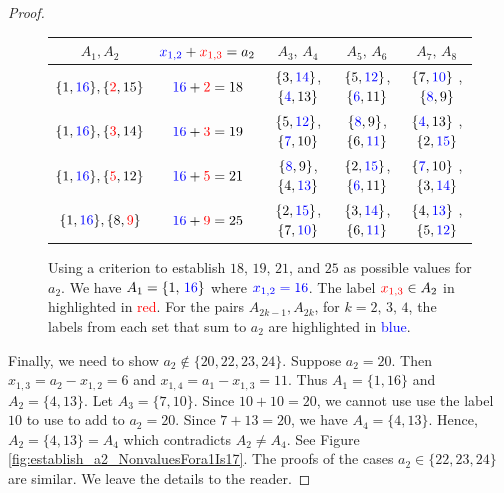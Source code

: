 \documentclass[10pt,a4paper]{amsart}
\begin{document}
\begin{proof}
\begin{figure}[ht]
    \centering
    {\small
\renewcommand{\arraystretch}{1.5}
\begin{tabular}{|c|c|c|c|c|} \hline
$A_1, A_2$ & $\textcolor{blue}{x_{1,2}} +\textcolor{red}{x_{1,3}}=a_2$ & $A_3,\, A_4$ &  $A_5,\, A_6$ 
&  $A_7,\, A_8$\\  \hline
$\{1, \textcolor{blue}{16}\}, \{\textcolor{red}{2},15\}$ & $\textcolor{blue}{16}+\textcolor{red}{2}=18$ 
& $\{ 3,\textcolor{blue}{14}\}$, $\{ \textcolor{blue}{4},13\}$  
&  $\{ 5, \textcolor{blue}{12}  \}$, $\{ \textcolor{blue}{6}, 11\}$  
&  $\{7, \textcolor{blue}{10} \}$ , $\{\textcolor{blue}{8}, 9 \}$ \\  \hline
$\{1, \textcolor{blue}{16}\}, \{\textcolor{red}{3},14\}$ & $\textcolor{blue}{16}+\textcolor{red}{3}=19$ 
& $\{ 5,\textcolor{blue}{12}\}$, $\{ \textcolor{blue}{7},10\}$  
&  $\{ \textcolor{blue}{8}, 9  \}$, $\{6, \textcolor{blue}{11} \}$  
&  $\{\textcolor{blue}{4}, 13 \}$ , $\{2, \textcolor{blue}{15}\}$ \\  \hline
$\{1, \textcolor{blue}{16}\},   \{\textcolor{red}{5},12\}$ & $\textcolor{blue}{16}+\textcolor{red}{5}=21$ 
& $\{\textcolor{blue}{8},9\}$, $\{4, \textcolor{blue}{13}\}$  
&  $\{2, \textcolor{blue}{15}  \}$, $\{\textcolor{blue}{6}, 11 \}$  
&  $\{\textcolor{blue}{7},10 \}$ , $\{3, \textcolor{blue}{14}\}$ \\  \hline
$\{1, \textcolor{blue}{16}\},    \{8,\textcolor{red}{9}\}$ & $\textcolor{blue}{16}+\textcolor{red}{9}=25$ 
& $\{ 2,\textcolor{blue}{15}\}$, $\{7, \textcolor{blue}{10}\}$  
&  $\{3, \textcolor{blue}{14}\}$, $\{6, \textcolor{blue}{11} \}$  
&  $\{4, \textcolor{blue}{13} \}$ , $\{5, \textcolor{blue}{12}\}$ \\  \hline
\end{tabular}
    }
    \caption{Using a criterion to establish $18,\, 19, \, 21$, and $25$ as possible values for $a_2$.
    We have $A_1=\{1,\, \textcolor{blue}{16}\}$ where $\textcolor{blue}{x_{1,2}=16}$.
    The label $\textcolor{red}{x_{1,3}}\in A_2$ in highlighted in  \textcolor{red}{red}.
    For the pairs $A_{2k-1}, A_{2k}$, for $k=2,\, 3,\, 4$,
    the labels from each set that sum to $a_2$ are highlighted in 
    \textcolor{blue}{blue}.}
    
    \label{fig:establish_a2_valuesFora1Is17}
\end{figure}

Finally, we need to show $a_2\not\in\{ 20, 22, 23, 24\}$.
Suppose $a_2=20$. Then $x_{1,3}=a_2-x_{1,2}=6$ and $x_{1,4}=a_1-x_{1,3}=11$. Thus $A_1=\{ 1, 16\}$
and $A_2=\{ 4, 13\}$. Let $A_3=\{ 7,10\}$.
Since $10+10=20$, we cannot use use the label $10$ to
use to add to $a_2=20$. Since $7+13=20$, we have 
$A_4=\{ 4,13\}$. Hence, $A_2=\{ 4,13\}=A_4$ which contradicts $A_2\ne A_4$. See Figure \ref{fig:establish_a2_NonvaluesFora1Is17}.
The proofs of the cases $a_2\in\{ 22, 23, 24\}$
are similar. We leave the details to the reader.


\end{proof}
\end{document}
